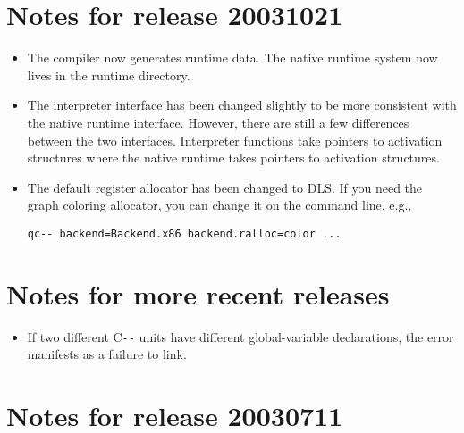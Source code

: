 \documentclass{article}
\def\PAL{\mbox{C{\texttt{-{}-}}}}
\begin{document}
\section{Notes for release 20031021}
\begin{itemize}
\item
The compiler now generates runtime data. The native runtime system now
lives in the runtime directory.
\item
The interpreter interface has been changed slightly to be more
consistent with the native runtime interface. However, there are still
a few differences between the two interfaces. Interpreter functions
take pointers to activation structures where the native runtime takes
pointers to activation structures.
\item
The default register allocator has been changed to DLS. If you need
the graph coloring allocator, you can change it on the command line,
e.g.,
\begin{verbatim}
qc-- backend=Backend.x86 backend.ralloc=color ...
\end{verbatim}


\end{itemize}

\section{Notes for more recent releases}

\begin{itemize}
\item
If two different {\PAL} units have different global-variable
declarations, the error manifests as a failure to link.
\end{itemize}


\section{Notes for release 20030711}
\end{document}
